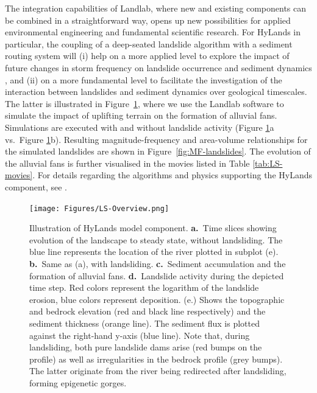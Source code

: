 \documentclass[12pt]{amsart}
\begin{document}
The integration capabilities of Landlab, where new and existing components can be combined in a straightforward way, opens up new possibilities for applied environmental engineering and fundamental scientific research. For HyLands in particular, the coupling of a deep-seated landslide algorithm with a sediment routing system will (i) help on a more applied level to explore the impact of future changes in storm frequency on landslide occurrence and sediment dynamics \citep{Fan2019}, and (ii) on a more fundamental level to facilitate the investigation of the interaction between landslides and sediment dynamics over geological timescales. The latter is illustrated in Figure~\ref{fig:landslides}, where we use the Landlab software to simulate the impact of uplifting terrain on the formation of alluvial fans. Simulations are executed with and without landslide activity (Figure \ref{fig:landslides}a vs.\ Figure \ref{fig:landslides}b). Resulting magnitude-frequency and area-volume relationships for the simulated landslides are shown in Figure~\ref{fig:MF-landslides}. The evolution of the alluvial fans is further visualised in the movies listed in Table \ref{tab:LS-movies}. For details regarding the algorithms and physics supporting the HyLands component, see \cite{campforts2020hylands}.

\begin{figure}
\texttt{[image: Figures/LS-Overview.png]}
\caption{Illustration of HyLands model component. \textbf{a.}\ Time slices showing evolution of the landscape to steady state, without landsliding. The blue line represents the location of the river plotted in subplot (e). \textbf{b.}\ Same as (a), with landsliding. \textbf{c.}\ Sediment accumulation and the formation of alluvial fans. \textbf{d.}\ Landslide activity during the depicted time step. Red colors represent the logarithm of the landslide erosion, blue colors represent deposition. (e.) Shows the topographic and bedrock elevation (red and black line respectively) and the sediment thickness (orange line). The sediment flux is plotted against the right-hand y-axis (blue line). Note that, during landsliding, both pure landslide dams arise (red bumps on the profile) as well as irregularities in the bedrock profile (grey bumps). The latter originate from the river being redirected after landsliding, forming epigenetic gorges.}
\label{fig:landslides}
\end{figure}
\end{document}
